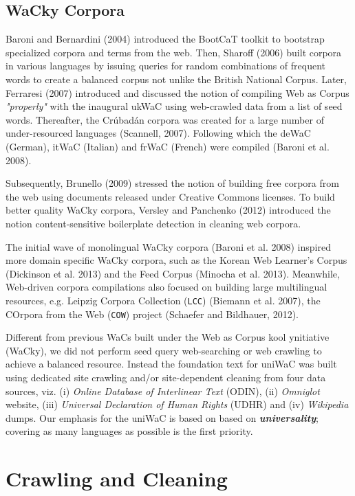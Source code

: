 \documentclass[11pt]{article}
\begin{document}
\subsection{WaCky Corpora}

Baroni and Bernardini (2004) introduced the BootCaT toolkit to bootstrap specialized corpora and terms from the web. Then, Sharoff (2006) built corpora in various languages by issuing queries for random combinations of frequent words to create a balanced corpus not unlike the British National Corpus. Later, Ferraresi (2007) introduced and discussed the notion of compiling Web as Corpus \emph{"properly"} with the inaugural ukWaC using web-crawled data from a list of seed words. Thereafter, the Crúbadán corpora was created for a large number of under-resourced languages (Scannell, 2007). Following which the deWaC (German), itWaC (Italian) and frWaC (French) were compiled (Baroni et al. 2008). 

Subsequently, Brunello (2009) stressed the notion of building free corpora from the web using documents released under Creative Commons licenses. To build better quality WaCky corpora, Versley and Panchenko (2012) introduced the notion content-sensitive boilerplate detection in cleaning web corpora. 

The initial wave of monolingual WaCky corpora (Baroni et al. 2008) inspired more domain specific WaCky corpora, such as the Korean Web Learner's Corpus (Dickinson et al. 2013) and the Feed Corpus (Minocha et al. 2013). Meanwhile, Web-driven corpora compilations also focused on building large  multilingual resources, e.g. Leipzig Corpora Collection (\texttt{LCC}) (Biemann et al. 2007), the COrpora from the Web (\texttt{COW}) project (Schaefer and Bildhauer, 2012).

Different from previous WaCs built under the Web as Corpus kool ynitiative (WaCky), we did not perform seed query web-searching or web crawling to achieve a balanced resource. Instead the foundation text for uniWaC was built using dedicated site crawling and/or site-dependent cleaning from four data sources, viz. (i) \emph{Online Database of Interlinear Text} (ODIN), (ii) \emph{Omniglot} website, (iii) \emph{Universal Declaration of Human Rights} (UDHR) and (iv) \emph{Wikipedia} dumps. Our emphasis for the uniWaC is based on based on \textbf{\emph{universality}}; covering as many languages as possible is the first priority.

\section{Crawling and Cleaning}
\end{document}
